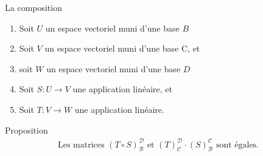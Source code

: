 \begin{parag}{La composition}
    \begin{enumerate}
        \item Soit $U$ un espace vectoriel muni d'une base $B$
        \item Soit $V$ un espace vectoriel muni d'une base C, et
        \item soit $W$ un espace vectoriel muni d'une base $D$
        \item Soit $S : U \to V$ une application linéaire, et
        \item Soit $T : V \to W$ une application linéaire.


    \end{enumerate}
    \begin{subparag}{Proposition}
       \begin{align*}
\text{Les matrices } (T \circ S)_{\mathcal{B}}^{\mathcal{D}} \text{ et } (T)_{\mathcal{C}}^{\mathcal{D}} \cdot (S)_{\mathcal{B}}^{\mathcal{C}} \text{ sont égales.}
\end{align*}


\end{subparag}
\end{parag}
